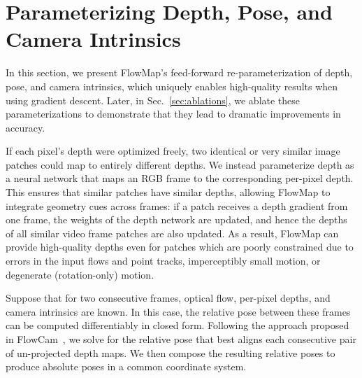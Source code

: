 \section{Parameterizing Depth, Pose, and Camera Intrinsics}
\label{sec:reparams}
In this section, we present FlowMap's feed-forward re-parameterization of depth, pose, and camera intrinsics, which uniquely enables high-quality results when using gradient descent. 
Later, in Sec.~\ref{sec:ablations}, we ablate these parameterizations to demonstrate that they lead to dramatic improvements in accuracy.

If each pixel's depth were optimized freely, two identical or very similar image patches could map to entirely different depths.
We instead parameterize depth as a neural network that maps an RGB frame to the corresponding per-pixel depth. 
This ensures that similar patches have similar depths, allowing FlowMap to integrate geometry cues across frames: if a patch receives a depth gradient from one frame, the weights of the depth network are updated, and hence the depths of all similar video frame patches are also updated.
As a result, FlowMap can provide high-quality depths even for patches which are poorly constrained due to errors in the input flows and point tracks, imperceptibly small motion, or degenerate (rotation-only) motion.


Suppose that for two consecutive frames, optical flow, per-pixel depths, and camera intrinsics are known.
In this case, the relative pose between these frames can be computed differentiably in closed form.
Following the approach proposed in FlowCam~\cite{smith2023flowcam}, we solve for the relative pose that best aligns each consecutive pair of un-projected depth maps.
We then compose the resulting relative poses to produce absolute poses in a common coordinate system.

